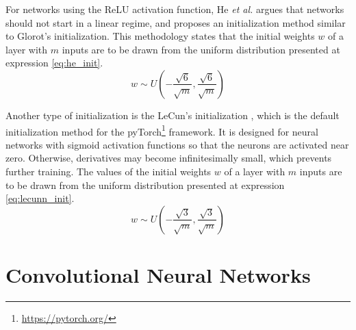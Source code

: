     For networks using the ReLU activation function, He \textit{et al.} \cite{He2015} argues that networks should not start in a linear regime, and proposes an initialization method similar to Glorot's initialization. This methodology states that the initial weights $w$ of a layer with $m$ inputs are to be drawn from the uniform distribution presented at expression \ref{eq:he_init}.
    \begin{equation}
        w \sim U(-\frac{\sqrt{6}}{\sqrt{m}}, \frac{\sqrt{6}}{\sqrt{m}})
        \label{eq:he_init}
    \end{equation} 
    
    Another type of initialization is the LeCun’s initialization \cite{LeCun1998}, which is the default initialization method for the pyTorch\footnote{\url{https://pytorch.org/}} framework. It is designed for neural networks with sigmoid activation functions so that the neurons are activated near zero. Otherwise, derivatives may become infinitesimally small, which prevents further training. The values of the initial weights $w$ of a layer with $m$ inputs are to be drawn from the uniform distribution presented at expression \ref{eq:lecunn_init}.
    \begin{equation}
        w \sim U(-\frac{\sqrt{3}}{\sqrt{m}}, \frac{\sqrt{3}}{\sqrt{m}})
        \label{eq:lecunn_init}
    \end{equation}  

\section{Convolutional Neural Networks}
\label{section:cnn}
